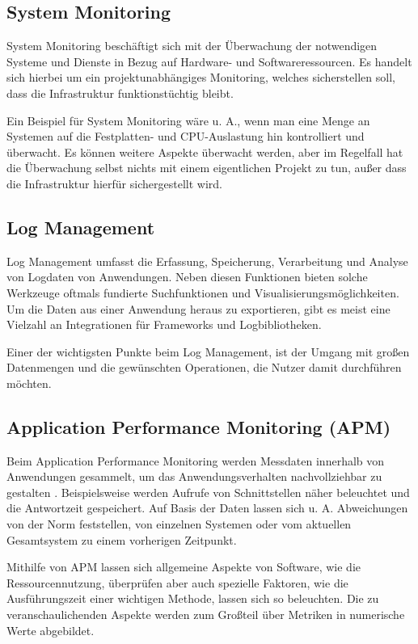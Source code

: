 \subsection{System Monitoring}

System Monitoring beschäftigt sich mit der Überwachung der notwendigen Systeme und Dienste in Bezug auf Hardware- und Softwareressourcen. Es handelt sich hierbei um ein projektunabhängiges Monitoring, welches sicherstellen soll, dass die Infrastruktur funktionstüchtig bleibt.

Ein Beispiel für System Monitoring wäre u. A., wenn man eine Menge an Systemen auf die Festplatten- und CPU-Auslastung hin kontrolliert und überwacht. Es können weitere Aspekte überwacht werden, aber im Regelfall hat die Überwachung selbst nichts mit einem eigentlichen Projekt zu tun, außer dass die Infrastruktur hierfür sichergestellt wird.

\subsection{Log Management}

Log Management umfasst die Erfassung, Speicherung, Verarbeitung und Analyse von Logdaten von Anwendungen. Neben diesen Funktionen bieten solche Werkzeuge oftmals fundierte Suchfunktionen und Visualisierungsmöglichkeiten. Um die Daten aus einer Anwendung heraus zu exportieren, gibt es meist eine Vielzahl an Integrationen für Frameworks und Logbibliotheken.

Einer der wichtigsten Punkte beim Log Management, ist der Umgang mit großen Datenmengen und die gewünschten Operationen, die Nutzer damit durchführen möchten.

\subsection{Application Performance Monitoring (APM)}

Beim Application Performance Monitoring werden Messdaten innerhalb von Anwendungen gesammelt, um das Anwendungsverhalten nachvollziehbar zu gestalten \cite{StudyingTheEffectivenessOfAPMTools}. Beispielsweise werden Aufrufe von Schnittstellen näher beleuchtet und die Antwortzeit gespeichert. Auf Basis der Daten lassen sich u. A. Abweichungen von der Norm feststellen, von einzelnen Systemen oder vom aktuellen Gesamtsystem zu einem vorherigen Zeitpunkt.

Mithilfe von APM lassen sich allgemeine Aspekte von Software, wie die Ressourcennutzung, überprüfen aber auch spezielle Faktoren, wie die Ausführungszeit einer wichtigen Methode, lassen sich so beleuchten. Die zu veranschaulichenden Aspekte werden zum Großteil über Metriken in numerische Werte abgebildet.

